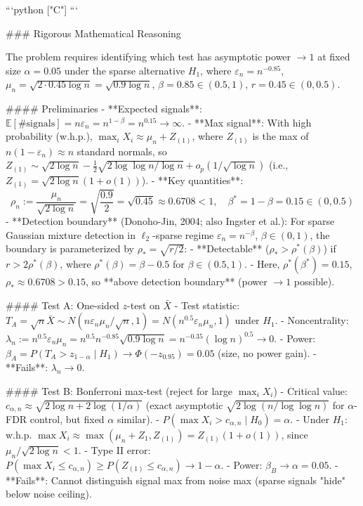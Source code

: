 ```python
["C"]
```

### Rigorous Mathematical Reasoning

The problem requires identifying which test has asymptotic power $\to 1$ at fixed size $\alpha=0.05$ under the sparse alternative $H_1$, where $\varepsilon_n = n^{-0.85}$, $\mu_n = \sqrt{2 \cdot 0.45 \log n} = \sqrt{0.9 \log n}$, $\beta=0.85 \in (0.5,1)$, $r=0.45 \in (0,0.5)$.

#### Preliminaries
- **Expected signals**: $\mathbb{E}[\#\text{signals}] = n \varepsilon_n = n^{1-\beta} = n^{0.15} \to \infty$.
- **Max signal**: With high probability (w.h.p.), $\max_i X_i \approx \mu_n + Z_{(1)}$, where $Z_{(1)}$ is the max of $n(1-\varepsilon_n) \approx n$ standard normals, so $Z_{(1)} \sim \sqrt{2\log n} - \frac{1}{2}\sqrt{2\log\log n/\log n} + o_p(1/\sqrt{\log n})$ (i.e., $Z_{(1)} = \sqrt{2\log n}(1+o(1))$).
- **Key quantities**:
  $$
  \rho_n := \frac{\mu_n}{\sqrt{2\log n}} = \sqrt{\frac{0.9}{2}} = \sqrt{0.45} \approx 0.6708 < 1, \quad \beta^*=1-\beta=0.15 \in (0,0.5)
  $$
- **Detection boundary** (Donoho-Jin, 2004; also Ingster et al.): For sparse Gaussian mixture detection in $\ell_2$-sparse regime $\varepsilon_n = n^{-\beta}$, $\beta\in(0,1)$, the boundary is parameterized by $\rho_* = \sqrt{r/2}$:
  - **Detectable** ($\rho_* > \rho^*(\beta)$) if $r > 2\rho^*(\beta)$, where $\rho^*(\beta) = \beta-0.5$ for $\beta\in(0.5,1)$.
  - Here, $\rho^*(\beta^*) = 0.15$, $\rho_* \approx 0.6708 > 0.15$, so **above detection boundary** (power $\to 1$ possible).

#### Test A: One-sided $z$-test on $\bar{X}$
- Test statistic: $T_A = \sqrt{n} \bar{X} \sim N\left( n\varepsilon_n \mu_n / \sqrt{n}, 1 \right) = N\left( n^{0.5} \varepsilon_n \mu_n, 1 \right)$ under $H_1$.
- Noncentrality: $\lambda_n := n^{0.5} \varepsilon_n \mu_n = n^{0.5} n^{-0.85} \sqrt{0.9\log n} = n^{-0.35} (\log n)^{0.5} \to 0$.
- Power: $\beta_A = P(T_A > z_{1-\alpha} \mid H_1) \to \Phi(-z_{0.95}) = 0.05$ (size, no power gain).
- **Fails**: $\lambda_n \to 0$.

#### Test B: Bonferroni max-test (reject for large $\max_i X_i$)
- Critical value: $c_{\alpha,n} \approx \sqrt{2\log n + 2\log(1/\alpha)}$ (exact asymptotic $\sqrt{2\log(n/\log\log n)}$ for $\alpha$-FDR control, but fixed $\alpha$ similar).
- $P(\max X_i > c_{\alpha,n} \mid H_0) = \alpha$.
- Under $H_1$: w.h.p. $\max X_i \approx \max(\mu_n + Z_1, Z_{(1)}) = Z_{(1)}(1+o(1))$, since $\mu_n/\sqrt{2\log n} < 1$.
- Type II error: $P(\max X_i \le c_{\alpha,n}) \ge P(Z_{(1)} \le c_{\alpha,n}) \to 1-\alpha$.
- Power: $\beta_B \to \alpha = 0.05$.
- **Fails**: Cannot distinguish signal max from noise max (sparse signals "hide" below noise ceiling).

